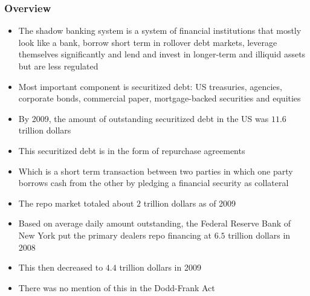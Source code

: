 \documentclass[11pt]{beamer}
\begin{document}
\begin{frame}
\begin{center}
\end{center}
\end{frame}
\begin{frame}
\frametitle{Overview}
\begin{itemize}
\item The shadow banking system is a system of financial institutions that mostly look like a bank, borrow short term in rollover debt markets, leverage themselves significantly and lend and invest in longer-term and illiquid assets but are less regulated
\item Most important component is securitized debt: US treasuries, agencies, corporate bonds, commercial paper, mortgage-backed securities and equities
\item By 2009, the amount of outstanding securitized debt in the US was $11.6$ trillion dollars
\item This securitized debt is in the form of repurchase agreements
\item Which is a short term transaction between two parties in which one party borrows cash from the other by pledging a financial security as collateral
\end{itemize}
\end{frame}

\begin{frame}
\begin{itemize}
\item The repo market totaled about $2$ trillion dollars as of 2009
\item Based on average daily amount outstanding, the Federal Reserve Bank of New York put the primary dealers repo financing at $6.5$ trillion dollars in 2008
\item This then decreased to $4.4$ trillion dollars in 2009
\item There was no mention of this in the Dodd-Frank Act
\end{itemize}
\end{frame}
\end{document}
